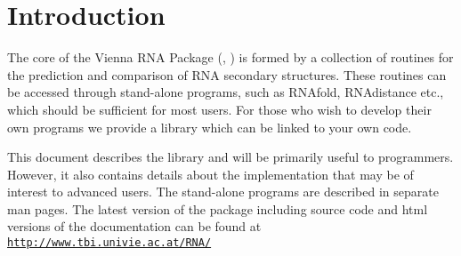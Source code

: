 \hypertarget{index_mp_intro}{}\section{Introduction}\label{index_mp_intro}
The core of the Vienna R\+NA Package (\cite{lorenz:2011}, \cite{hofacker:1994}) is formed by a collection of routines for the prediction and comparison of R\+NA secondary structures. These routines can be accessed through stand-\/alone programs, such as R\+N\+Afold, R\+N\+Adistance etc., which should be sufficient for most users. For those who wish to develop their own programs we provide a library which can be linked to your own code.

This document describes the library and will be primarily useful to programmers. However, it also contains details about the implementation that may be of interest to advanced users. The stand-\/alone programs are described in separate man pages. The latest version of the package including source code and html versions of the documentation can be found at ~\newline
~\newline
\href{http://www.tbi.univie.ac.at/RNA/}{\tt http\+://www.\+tbi.\+univie.\+ac.\+at/\+R\+N\+A/} 